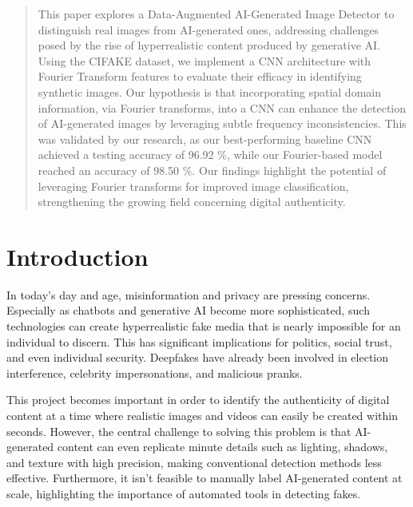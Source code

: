 \author{
Everest Yang, Tanay Subramanian, Sujith Pakala, Sami Nourji\\
    \emph{TA:} Winston Li \\
    Brown University\\
}

\maketitle

\begin{abstract}
This paper explores a Data-Augmented AI-Generated Image Detector to distinguish real images from AI-generated ones, addressing challenges posed by the rise of hyperrealistic content produced by generative AI. Using the CIFAKE dataset, we implement a CNN architecture with Fourier Transform features to evaluate their efficacy in identifying synthetic images. Our hypothesis is that incorporating spatial domain information, via Fourier transforms, into a CNN can enhance the detection of AI-generated images by leveraging subtle frequency inconsistencies. This was validated by our research, as our best-performing baseline CNN achieved a testing accuracy of 96.92 \%, while our Fourier-based model reached an accuracy of 98.50 \%. Our findings highlight the potential of leveraging Fourier transforms for improved image classification, strengthening the growing field concerning digital authenticity.
\end{abstract}

\section{Introduction}

In today’s day and age, misinformation and privacy are pressing concerns. Especially as chatbots and generative AI become more sophisticated, such technologies can create hyperrealistic fake media that is nearly impossible for an individual to discern. This has significant implications for politics, social trust, and even individual security. Deepfakes have already been involved in election interference, celebrity impersonations, and malicious pranks. 

This project becomes important in order to identify the authenticity of digital content at a time where realistic images and videos can easily be created within seconds. However, the central challenge to solving this problem is that AI-generated content can even replicate minute details such as lighting, shadows, and texture with high precision, making conventional detection methods less effective. Furthermore, it isn’t feasible to manually label AI-generated content at scale, highlighting the importance of automated tools in detecting fakes.

